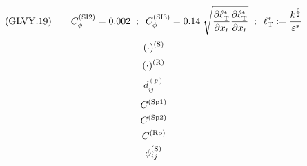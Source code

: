 \documentclass{article}
\begin{document}
\begin{equation}
({\rm GLVY}.19)\qquad
C_\phi^{(\mathrm{\tiny SI2})}=0.002\;\; ; \;\;
C_\phi^{(\mathrm{\tiny SI3})}= 0.14\;\sqrt{\frac{\partial\ell^*_\mathrm{\tiny T}}{\partial x_\ell}
                                           \frac{\partial\ell^*_\mathrm{\tiny T}}{\partial x_\ell}}\;\; ; \;\;
\ell_{\mathrm{\tiny T}}^*:=\frac{k^\frac{3}{2}}{\varepsilon^*}
\end{equation}
\begin{equation}
(\cdot)^{(\mathrm{\tiny S})}
\end{equation}
\begin{equation}
(\cdot)^{(\mathrm{\tiny R})}
\end{equation}
\begin{equation}
d_{ij}^{(p)}
\end{equation}
\begin{equation}
C^{(\mathrm{\tiny Sp1})}
\end{equation}
\begin{equation}
C^{(\mathrm{\tiny Sp2})}
\end{equation}
\begin{equation}
C^{(\mathrm{\tiny Rp })}
\end{equation}
\begin{equation}
\phi^{(\mathrm{\tiny S})}_{ij}
\end{equation}
\end{document}

